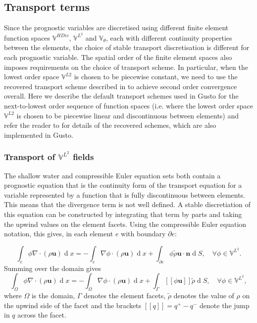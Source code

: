 \documentclass[journal abbreviation, manuscript]{copernicus}
\def\MM#1{\boldsymbol{#1}}
\DeclareMathOperator{\diff}{d}
\newcommand{\jump}[1]{[\![#1]\!]}
\begin{document}
\subsection{Transport terms}
Since the prognostic variables are discretised using different finite
element function spaces $\mathbb{V}^{HDiv}$, $\mathbb{V}^{L^2}$ and
$\mathbb{V}_\theta$, each with different continuity properties between
the elements, the choice of stable transport discretisation is
different for each prognostic variable. The spatial order of the
finite element spaces also imposes requirements on the choice of
transport scheme. In particular, when the lowest order space
$\mathbb{V}^{L2}$ is chosen to be piecewise constant, we need to use
the recovered transport scheme described in
\citet{bendall2019recovered} to achieve second order convergence
overall. Here we describe the default transport schemes used in Gusto
for the next-to-lowest order sequence of function spaces (i.e. where
the lowest order space $\mathbb{V}^{L2}$ is chosen to be piecewise
linear and discontinuous between elements) and refer the reader to
\citet{bendall2019recovered} for details of the recovered schemes,
which are also implemented in Gusto.

\subsubsection{Transport of $\mathbb{V}^{L^2}$ fields}
The shallow water and compressible Euler equation sets both contain a
prognostic equation that is the continuity form of the transport
equation for a variable represented by a function that is fully
discontinuous between elements. This means that the divergence term is
not well defined. A stable discretiation of this equation can be
constructed by integrating that term by parts and taking the upwind
values on the element facets. Using the compressible Euler equation
notation, this gives, in each element $e$ with boundary $\partial e$:

\begin{equation}
  \int_e \phi\nabla\cdot(\rho\MM{u}) \diff x = -\int_e \nabla\phi \cdot (\rho\MM{u}) \diff x + \int_{\partial e} \phi\tilde{\rho}\MM{u}\cdot\MM{n} \diff S, \quad \forall \phi \in \mathbb{V}^{L^2}.
\end{equation}
Summing over the domain gives
\begin{equation}
  \int_\Omega \phi\nabla\cdot(\rho\MM{u}) \diff x = -\int_\Omega \nabla\phi \cdot (\rho\MM{u}) \diff x + \int_\Gamma \jump{\phi\MM{u}}\tilde{\rho} \diff S, \quad \forall \phi \in \mathbb{V}^{L^2},
\end{equation}
where $\Omega$ is the domain, $\Gamma$ denotes the element facets,
$\tilde{\rho}$ denotes the value of $\rho$ on the upwind side of the
facet and the brackets $\jump{q} = q^+-q^-$ denote the jump in $q$
across the facet.
\end{document}
